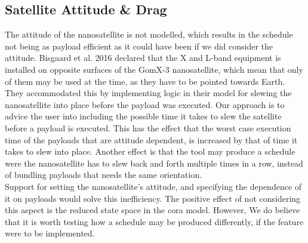 \subsection*{Satellite Attitude \& Drag}
The attitude of the nanosatellite is not modelled, which results in the schedule not being as payload efficient as it could have been if we did consider the attitude. Bisgaard et al. 2016\cite{gomx3} declared that the X and L-band equipment is installed on opposite surfaces of the GomX-3 nanosatellite, which mean that only of them may be used at the time, as they have to be pointed towards Earth. They accommodated this by implementing logic in their model for slewing the nanosatellite into place before the payload was executed. Our approach is to advice the user into including the possible time it takes to slew the satellite before a payload is executed. This has the effect that the worst case execution time of the payloads that are attitude dependent, is increased by that of time it takes to slew into place. Another effect is that the tool may produce a schedule were the nanosatellite has to slew back and forth multiple times in a row, instead of bundling payloads that needs the same orientation.\\
Support for setting the nanosatellite's attitude, and specifying the dependence of it on payloads would solve this inefficiency.
The positive effect of not considering this aspect is the reduced state space in the \gls{cora} model. However, We do believe that it is worth testing how a schedule may be produced differently, if the feature were to be implemented.


